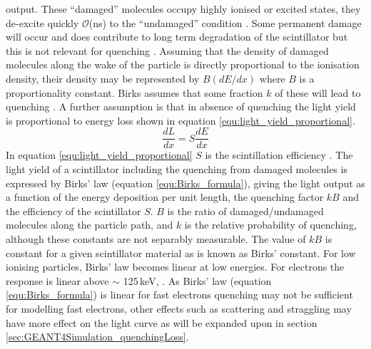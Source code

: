 output. These “damaged” molecules occupy highly ionised or excited states, they de-excite quickly $\mathcal{O}$(ns) to the “undamaged” condition \cite{knoll_2010}. Some permanent damage will occur and does contribute to long term degradation of the scintillator but this is not relevant for quenching \cite{knoll_2010}. Assuming that the density of damaged molecules along the wake of the particle is directly proportional to the ionisation density, their density may be represented by $B(dE/dx)$ where $B$ is a proportionality constant. Birks assumes that some fraction $k$ of these will lead to quenching \cite{craun_1970}. A further assumption is that in absence of quenching the light yield is proportional to energy loss shown in equation \ref{equ:light_yield_proportional}.
\begin{equation}
\frac{dL}{dx} = S\frac{dE}{dx}
\label{equ:light_yield_proportional}
\end{equation}
In equation \ref{equ:light_yield_proportional} $S$ is the scintillation efficiency \cite{birks_1964}. The light yield of a scintillator including the quenching from damaged molecules is expressed by Birks' law (equation \ref{equ:Birks_formula}), giving the light output as a function of the energy deposition per unit length, the quenching factor $kB$ and the efficiency of the scintillator $S$. $B$ is the ratio of damaged/undamaged molecules along the particle path, and $k$ is the relative probability of quenching, although these constants are not separably measurable. The value of $kB$ is constant for a given scintillator material as is known as Birks' constant. For low ionising particles, Birks' law becomes linear at low energies. For electrons the response is linear above $\sim$ 125\,keV, \cite{craun_1970}. As Birks' law (equation \ref{equ:Birks_formula}) is linear for fast electrons \cite{knoll_2010} quenching may not be sufficient for modelling fast electrons, other effects such as scattering and straggling may have more effect on the light curve as will be expanded upon in section \ref{sec:GEANT4Simulation_quenchingLoss}. 

